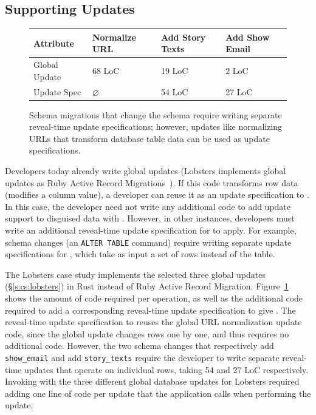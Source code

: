 \subsection{Supporting Updates}
\label{s:eval-updates:support}
\begin{figure}
    \centering
    \begin{tabular}{m{}|m{}|m{}|m{}}
        \centering\textbf{Attribute} & \textbf{Normalize URL} & \textbf{Add Story Texts} &
        \textbf{Add Show Email} \\
        \hline
        Global Update & 68 LoC & 19 LoC & 2 LoC \\
        \hline
        Update Spec & $\varnothing$ & 54 LoC & 27 LoC \\
    \end{tabular}
    \caption[Code required to write reveal-time update specifications.]{Schema
    migrations that change the schema require
    writing separate reveal-time update specifications; however, updates like
    normalizing URLs that transform database table data can be used as update
    specifications.}
    \label{tab:updates}
\end{figure}

Developers today already write global updates (\eg Lobsters implements global
updates as Ruby Active Record Migrations~\cite{ruby_arm}). If this code
transforms row data (\eg modifies a column value), a developer can reuse it as
an update specification to \sys. In this case, the developer need not write any
additional code to add update support to disguised data with \sys.
%
However, in other instances, developers must write an additional
reveal-time update specification for \sys to apply.
%
For example, schema changes (\eg an \texttt{ALTER TABLE} command) require
writing separate update specifications for \sys, which take as input a set of
rows instead of the table.
%

%
The Lobsters case study implements the selected three global updates
(\S\ref{s:cs:lobsters})
in Rust instead of Ruby Active Record Migration. Figure~\ref{tab:updates} shows
the amount of code required per operation, as well as the additional code
required to add a corresponding reveal-time update specification to give \sys.
The reveal-time update specification to \sys reuses the global URL normalization
update code, since the global update changes rows one by one, and thus requires
no additional code.
%
However, the two schema changes that respectively add
\texttt{show\_email} and add \texttt{story\_texts} require the developer to
write separate reveal-time updates that operate on individual rows, taking 54
and 27 LoC respectively.
%
%
Invoking \sys with the three different global database updates for Lobsters
required adding one line of code per update that the application calls when
performing the update. 
%

